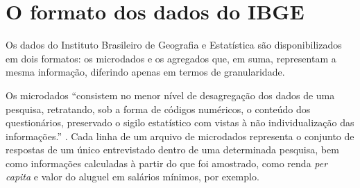 




\section{O formato dos dados do IBGE}

    Os dados do Instituto Brasileiro de Geografia e Estatística são disponibilizados em dois formatos: os microdados e os agregados que, em suma, representam a mesma informação, diferindo apenas em termos de granularidade.

    Os microdados ``consistem no menor nível de desagregação dos dados de uma pesquisa, retratando, sob a forma de códigos numéricos, o conteúdo dos questionários, preservado o sigilo estatístico com vistas à não individualização das informações.'' \cite{microdados}. Cada linha de um arquivo de microdados representa o conjunto de respostas de um único entrevistado dentro de uma determinada pesquisa, bem como informações calculadas à partir do que foi amostrado, como renda \textit{per capita} e valor do aluguel em salários mínimos, por exemplo.


